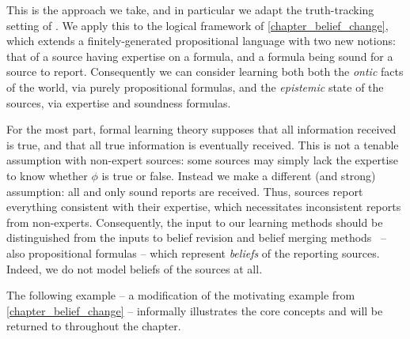 This is the approach we take, and in particular we adapt the truth-tracking
setting of \textcite{baltag_tt_2019}. We apply this to the logical framework of
\cref{chapter_belief_change}, which extends a finitely-generated propositional
language with two new notions: that of a source having expertise on a
formula, and a formula being sound for a source to report. Consequently
we can consider learning both both the \emph{ontic} facts of the world, via
purely propositional formulas, and the \emph{epistemic} state of the
sources, via expertise and soundness formulas.

For the most part, formal learning theory supposes that all information
received is true, and that all true information is eventually
received.\footnotemark{} This is not a tenable assumption with non-expert
sources: some sources may simply lack the expertise to know whether $\phi$ is
true or false. Instead we make a different (and strong) assumption: all and
only sound reports are received. Thus, sources report everything
consistent with their expertise, which necessitates inconsistent reports from
non-experts. Consequently, the input to
our learning methods should be distinguished from the inputs to belief revision
and belief merging methods~\cite{alchourron1985logic,konieczny2002merging} --
also propositional formulas -- which represent \emph{beliefs} of the reporting
sources. Indeed, we do not model beliefs of the sources at all.



The following example -- a modification of the motivating example from
\cref{chapter_belief_change} -- informally illustrates the core concepts and
will be returned to throughout the chapter.

